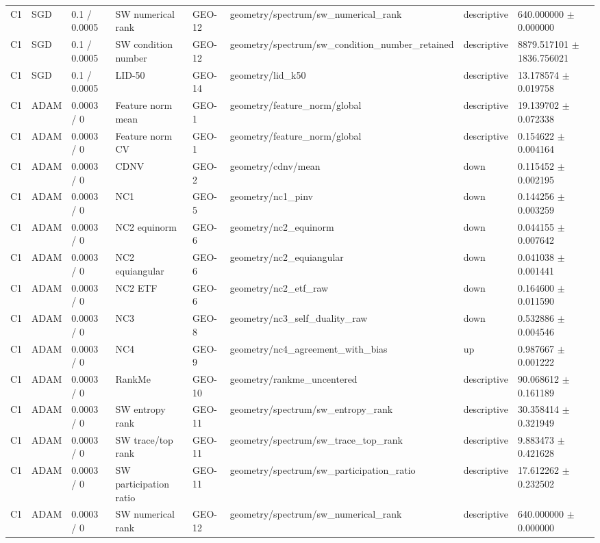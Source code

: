 \begin{longtable}{llllllll}
C1 & SGD & 0.1 / 0.0005 & SW numerical rank & GEO-12 & geometry/spectrum/sw\_numerical\_rank & descriptive & 640.000000 $\pm$ 0.000000 \\
C1 & SGD & 0.1 / 0.0005 & SW condition number & GEO-12 & geometry/spectrum/sw\_condition\_number\_retained & descriptive & 8879.517101 $\pm$ 1836.756021 \\
C1 & SGD & 0.1 / 0.0005 & LID-50 & GEO-14 & geometry/lid\_k50 & descriptive & 13.178574 $\pm$ 0.019758 \\
C1 & ADAM & 0.0003 / 0 & Feature norm mean & GEO-1 & geometry/feature\_norm/global & descriptive & 19.139702 $\pm$ 0.072338 \\
C1 & ADAM & 0.0003 / 0 & Feature norm CV & GEO-1 & geometry/feature\_norm/global & descriptive & 0.154622 $\pm$ 0.004164 \\
C1 & ADAM & 0.0003 / 0 & CDNV & GEO-2 & geometry/cdnv/mean & down & 0.115452 $\pm$ 0.002195 \\
C1 & ADAM & 0.0003 / 0 & NC1 & GEO-5 & geometry/nc1\_pinv & down & 0.144256 $\pm$ 0.003259 \\
C1 & ADAM & 0.0003 / 0 & NC2 equinorm & GEO-6 & geometry/nc2\_equinorm & down & 0.044155 $\pm$ 0.007642 \\
C1 & ADAM & 0.0003 / 0 & NC2 equiangular & GEO-6 & geometry/nc2\_equiangular & down & 0.041038 $\pm$ 0.001441 \\
C1 & ADAM & 0.0003 / 0 & NC2 ETF & GEO-6 & geometry/nc2\_etf\_raw & down & 0.164600 $\pm$ 0.011590 \\
C1 & ADAM & 0.0003 / 0 & NC3 & GEO-8 & geometry/nc3\_self\_duality\_raw & down & 0.532886 $\pm$ 0.004546 \\
C1 & ADAM & 0.0003 / 0 & NC4 & GEO-9 & geometry/nc4\_agreement\_with\_bias & up & 0.987667 $\pm$ 0.001222 \\
C1 & ADAM & 0.0003 / 0 & RankMe & GEO-10 & geometry/rankme\_uncentered & descriptive & 90.068612 $\pm$ 0.161189 \\
C1 & ADAM & 0.0003 / 0 & SW entropy rank & GEO-11 & geometry/spectrum/sw\_entropy\_rank & descriptive & 30.358414 $\pm$ 0.321949 \\
C1 & ADAM & 0.0003 / 0 & SW trace/top rank & GEO-11 & geometry/spectrum/sw\_trace\_top\_rank & descriptive & 9.883473 $\pm$ 0.421628 \\
C1 & ADAM & 0.0003 / 0 & SW participation ratio & GEO-11 & geometry/spectrum/sw\_participation\_ratio & descriptive & 17.612262 $\pm$ 0.232502 \\
C1 & ADAM & 0.0003 / 0 & SW numerical rank & GEO-12 & geometry/spectrum/sw\_numerical\_rank & descriptive & 640.000000 $\pm$ 0.000000 \\

\end{longtable}
